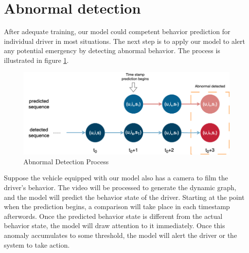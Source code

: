 \clearpage
\section{Abnormal detection}

After adequate training, our model could competent behavior prediction for individual driver in most situations. The next step is to apply our model to alert any potential emergency by detecting abnormal behavior. The process is illustrated in figure \ref{fig:anormal_detection}.
\begin{figure}[h]
    \centering
    \includegraphics[width=\linewidth]{figures/04_anormal_detection.png}
    \caption{Abnormal Detection Process}
    \label{fig:anormal_detection}
\end{figure}

Suppose the vehicle equipped with our model also has a camera to film the driver's behavior. The video will be processed to generate the dynamic graph, and the model will predict the behavior state of the driver.
Starting at the point when the prediction begins, a comparison will take place in each timestamp afterwords. Once the predicted behavior state is different from the actual behavior state, the model will draw attention to it immediately. Once this anomaly accumulates to some threshold, the model will alert the driver or the system to take action. 
